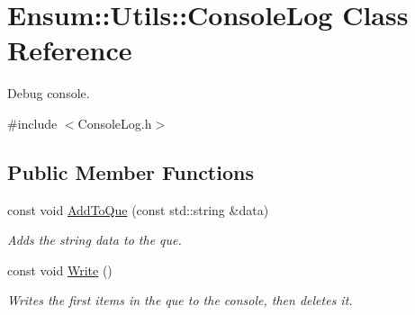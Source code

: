 \hypertarget{class_ensum_1_1_utils_1_1_console_log}{}\section{Ensum\+:\+:Utils\+:\+:Console\+Log Class Reference}
\label{class_ensum_1_1_utils_1_1_console_log}


Debug console.  




{\ttfamily \#include $<$Console\+Log.\+h$>$}

\subsection*{Public Member Functions}
\begin{DoxyCompactItemize}
\item 
const void \hyperlink{class_ensum_1_1_utils_1_1_console_log_abc61d8b873933eca1dce471498807839}{Add\+To\+Que} (const std\+::string \&data)\hypertarget{class_ensum_1_1_utils_1_1_console_log_abc61d8b873933eca1dce471498807839}{}\label{class_ensum_1_1_utils_1_1_console_log_abc61d8b873933eca1dce471498807839}

\begin{DoxyCompactList}\small\item\em Adds the string data to the que. \end{DoxyCompactList}\item 
const void \hyperlink{class_ensum_1_1_utils_1_1_console_log_a6d0cb31da153393c122cd5f9514eb6c9}{Write} ()
\begin{DoxyCompactList}\small\item\em Writes the first items in the que to the console, then deletes it. \end{DoxyCompactList}\end{DoxyCompactItemize}

